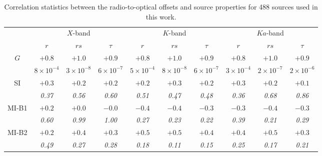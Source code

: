 \documentclass{aa}
\begin{document}

    \begin{table}
        \centering
        \caption{\label{tab:corr_test}
            Correlation statistics between the radio-to-optical offsets and source properties for 488 sources used in this work.
        }
        \begin{tabular}{cccccccccc}
        \hline \noalign{\smallskip}
            &\multicolumn{3}{c}{$X$-band}  &\multicolumn{3}{c}{$K$-band}  &\multicolumn{3}{c}{$Ka$-band}  \\
            \cmidrule(lr){2-4}  \cmidrule(lr){5-7}  \cmidrule(lr){8-10}
            &$r$  &$rs$  &$\tau$  &$r$  &$rs$  &$\tau$  &$r$  &$rs$  &$\tau$  \\
        \noalign{\smallskip}
        \hline
        \noalign{\smallskip}
          $G$  &$+0.8$  &$+1.0$  &$+0.9$  &$+0.8$  &$+1.0$  &$+0.9$  &$+0.8$  &$+1.0$  &$+0.9$  \\
               &\textit{$8 \times 10^{-4}$}  &\textit{$3 \times 10^{-8}$}  &\textit{$6 \times 10^{-7}$}
               &\textit{$5 \times 10^{-4}$}  &\textit{$8 \times 10^{-8}$}  &\textit{$6 \times 10^{-7}$}
               &\textit{$3 \times 10^{-4}$}  &\textit{$2 \times 10^{-7}$}  &\textit{$2 \times 10^{-6}$}  \\
           SI  &$+0.3$  &$+0.2$  &$+0.2$  &$+0.2$  &$+0.3$  &$+0.2$  &$+0.3$  &$+0.2$  &$+0.1$  \\
               &\textit{0.37}  &\textit{0.56}  &\textit{0.60}  &\textit{0.51}  &\textit{0.47}  &\textit{0.48}  &\textit{0.36}  &\textit{0.68}  &\textit{0.86}  \\
        MI-B1  &$+0.2$  &$+0.0$  &$-0.0$  &$-0.4$  &$-0.4$  &$-0.3$  &$-0.3$  &$-0.4$  &$-0.3$  \\
               &\textit{0.60}  &\textit{0.99}  &\textit{1.00}  &\textit{0.27}  &\textit{0.23}  &\textit{0.22}  &\textit{0.39}  &\textit{0.21}  &\textit{0.29}  \\
        MI-B2  &$+0.2$  &$+0.4$  &$+0.3$  &$+0.5$  &$+0.5$  &$+0.4$  &$+0.4$  &$+0.5$  &$+0.3$  \\
               &\textit{0.49}  &\textit{0.27}  &\textit{0.28}  &\textit{0.18}  &\textit{0.11}  &\textit{0.15}  &\textit{0.25}  &\textit{0.17}  &\textit{0.21}  \\

\end{tabular}
\end{table}
\end{document}
